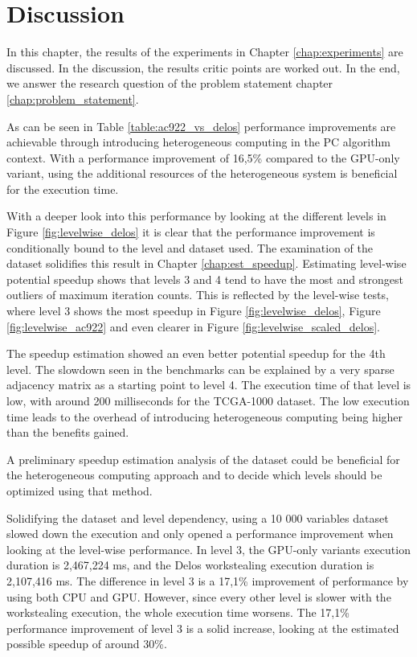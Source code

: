 \chapter{Discussion}
\label{chap:discussion}
In this chapter, the results of the experiments in Chapter \ref{chap:experiments} are discussed. In the discussion, the results critic points are worked out. In the end, we answer the research question of the problem statement chapter \ref{chap:problem_statement}.

% 
As can be seen in Table \ref{table:ac922_vs_delos} performance improvements are achievable through introducing heterogeneous computing in the PC algorithm context. With a performance improvement of 16,5\% compared to the GPU-only variant, using the additional resources of the heterogeneous system is beneficial for the execution time.

With a deeper look into this performance by looking at the different levels in Figure \ref{fig:levelwise_delos} it is clear that the performance improvement is conditionally bound to the level and dataset used. The examination of the dataset solidifies this result in Chapter \ref{chap:est_speedup}. Estimating level-wise potential speedup shows that levels 3 and 4 tend to have the most and strongest outliers of maximum iteration counts. This is reflected by the level-wise tests, where level 3 shows the most speedup in Figure \ref{fig:levelwise_delos}, Figure \ref{fig:levelwise_ac922} and even clearer in Figure \ref{fig:levelwise_scaled_delos}.

The speedup estimation showed an even better potential speedup for the 4th level. The slowdown seen in the benchmarks can be explained by a very sparse adjacency matrix as a starting point to level 4. The execution time of that level is low, with around 200 milliseconds for the TCGA-1000 dataset. The low execution time leads to the overhead of introducing heterogeneous computing being higher than the benefits gained.

A preliminary speedup estimation analysis of the dataset could be beneficial for the heterogeneous computing approach and to decide which levels should be optimized using that method.

Solidifying the dataset and level dependency, using a 10 000 variables dataset slowed down the execution and only opened a performance improvement when looking at the level-wise performance. In level 3, the GPU-only variants execution duration is 2,467,224 ms, and the Delos workstealing execution duration is 2,107,416 ms.
The difference in level 3 is a 17,1\% improvement of performance by using both CPU and GPU. However, since every other level is slower with the workstealing execution, the whole execution time worsens. The 17,1\% performance improvement of level 3 is a solid increase, looking at the estimated possible speedup of around 30\%.

